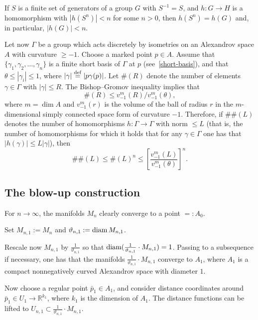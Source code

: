 \documentclass{amsart}
\begin{document}
\begin{tlem}\label{lem:triv}
If $S$ is a finite set of generators of a group $G$ with $S^{-1}=S$,
and $h\colon G\to H$ is a homomorphism with $|h(S^n)|< n$ for some $n>0$,
then $h(S^n)=h(G)$ and, in particular, $|h(G)|< n$.
\end{tlem}







Let now $\Gamma$ be a group which acts discretely
by isometries on an Alexandrov space $A$ with curvature $\ge -1$.
Choose a marked point $p\in A$.
Assume that $\{\gamma_1,\gamma_2,\ldots,\gamma_n\}$
is a finite short basis of $\Gamma$ at $p$ (see~\ref{short-basis}),
and that $\theta\le|\gamma_i|\le 1$,
where $|\gamma|\overset{\rm def}{=}|p\gamma(p)|$.
Let $\#(R)$
denote the number of elements $\gamma\in\Gamma$ with $|\gamma|\le R$.
The  Bishop--Gromov inequality implies that
$$\#(R)\le v^m_{-1}(R)/v^m_{-1}(\theta),$$
where $m=\dim A$ and $v^m_{-1}(r)$
is the volume of the ball of radius $r$
in the $m$-dimensional simply connected space form of curvature $-1$.
Therefore,
if $\#\#(L)$ denotes the number of homomorphisms
$h\colon \Gamma\to \Gamma$ with norm $\le L$
(that is, the number of homomorphisms
for which it holds that for any $\gamma\in\Gamma$
one has that $|h(\gamma)|\le L|\gamma|$),
then
\begin{equation}\label{e:hombd}
\#\#(L)\le \#(L)^n\le \left[\frac{v^m_{-1}(L)}{v^m_{-1}(\theta)}\right]^n.
\end{equation}



\subsection{The blow-up construction}\label{sec:constr}

For $n\to\infty$, the manifolds $M_n$ clearly converge to a point $=:A_0$.

Set $M_{n,1}:=M_n$ and $\vartheta_{n,1}:=\operatorname{\rm diam} M_{n,1}$.

Rescale now $M_{n,1}$ by $\tfrac{1}{\vartheta_{n,1}}$
so that $\operatorname{\rm diam}(\tfrac{1}{\vartheta_{n,1}}\cdot M_{n,1})=1$.
Passing to a subsequence if necessary, one has
that the manifolds $\frac{1}{\vartheta_{n,1}}{\cdot} M_{n,1}$
converge to $A_1$,
where $A_1$
is a compact nonnegatively curved Alexandrov space with diameter $1$.

Now choose a regular point $\bar p_1\in A_1$,
and consider distance coordinates around $\bar p_1\in U_1\to \mathbb{R}^{k_1}$,
where $k_1$ is the dimension of $A_1$.
The distance functions can be lifted
to $U_{n,1}\subset \frac{1}{\vartheta_{n,1}}{\cdot} M_{n,1}$.
\end{document}
